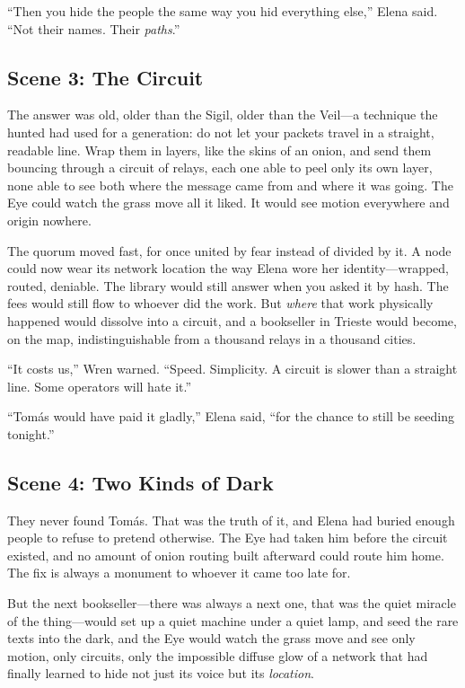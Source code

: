 \documentclass[12pt,letterpaper]{book}
\begin{document}
``Then you hide the people the same way you hid everything else,'' Elena said.
``Not their names. Their \emph{paths}.''

\hypertarget{scene-3-the-circuit}{%
\subsection{Scene 3: The
Circuit}\label{scene-3-the-circuit}}

The answer was old, older than the Sigil, older than the Veil---a technique the
hunted had used for a generation: do not let your packets travel in a straight,
readable line. Wrap them in layers, like the skins of an onion, and send them
bouncing through a circuit of relays, each one able to peel only its own layer,
none able to see both where the message came from and where it was going. The Eye
could watch the grass move all it liked. It would see motion everywhere and origin
nowhere.

The quorum moved fast, for once united by fear instead of divided by it. A node
could now wear its network location the way Elena wore her identity---wrapped,
routed, deniable. The library would still answer when you asked it by hash. The
fees would still flow to whoever did the work. But \emph{where} that work
physically happened would dissolve into a circuit, and a bookseller in Trieste
would become, on the map, indistinguishable from a thousand relays in a thousand
cities.

``It costs us,'' Wren warned. ``Speed. Simplicity. A circuit is slower than a
straight line. Some operators will hate it.''

``Tomás would have paid it gladly,'' Elena said, ``for the chance to still be
seeding tonight.''

\hypertarget{scene-4-two-kinds-of-dark}{%
\subsection{Scene 4: Two Kinds of
Dark}\label{scene-4-two-kinds-of-dark}}

They never found Tomás. That was the truth of it, and Elena had buried enough
people to refuse to pretend otherwise. The Eye had taken him before the circuit
existed, and no amount of onion routing built afterward could route him home. The
fix is always a monument to whoever it came too late for.

But the next bookseller---there was always a next one, that was the quiet
miracle of the thing---would set up a quiet machine under a quiet lamp, and seed
the rare texts into the dark, and the Eye would watch the grass move and see only
motion, only circuits, only the impossible diffuse glow of a network that had
finally learned to hide not just its voice but its \emph{location}.
\end{document}
